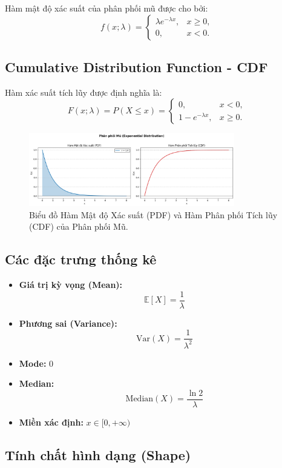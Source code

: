 \documentclass[a4paper,12pt]{article}
\begin{document}
Hàm mật độ xác suất của phân phối mũ được cho bởi:
\[
f(x;\lambda) = 
\begin{cases}
\lambda e^{-\lambda x}, & x \ge 0, \\
0, & x < 0.
\end{cases}
\]

\subsection{Cumulative Distribution Function - CDF}

Hàm xác suất tích lũy được định nghĩa là:
\[
F(x;\lambda) = P(X \le x) =
\begin{cases}
0, & x < 0,\\[0.5em]
1 - e^{-\lambda x}, & x \ge 0.
\end{cases}
\]

\begin{figure}[h!]
 \centering
 \includegraphics[width=0.8\textwidth]{images/Exp_PDF_and_CDF.png}
\caption{Biểu đồ Hàm Mật độ Xác suất (PDF) và Hàm Phân phối Tích lũy (CDF) của Phân phối Mũ.}
\label{fig:exponential_dist}
\end{figure}

\subsection{Các đặc trưng thống kê}

\begin{itemize}
    \item \textbf{Giá trị kỳ vọng (Mean):}
    \[
    \mathbb{E}[X] = \frac{1}{\lambda}
    \]
    \item \textbf{Phương sai (Variance):}
    \[
    \mathrm{Var}(X) = \frac{1}{\lambda^2}
    \]
    \item \textbf{Mode:} $0$
    \item \textbf{Median:}
    \[
    \mathrm{Median}(X) = \frac{\ln 2}{\lambda}
    \]
    \item \textbf{Miền xác định:} $x \in [0, +\infty)$
\end{itemize}

\subsection{Tính chất hình dạng (Shape)}
\end{document}
